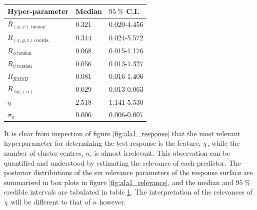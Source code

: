 \begin{table}
    \centering
    \begin{tabular}{|l|l|l|}
    \hline
                          Hyper-parameter &    Median & $\SI{95}{\percent}$ C.I. \\
    \hline\hline
     $R_{(\phi, \psi)\ \mathrm{torsion}}$ &  0.321 & 0.020-4.456 \\
        $R_{(x, y, z)\ \mathrm{coords.}}$ &  0.344 & 0.024-5.572 \\
             $R_{\phi\ \mathrm{torsion}}$ &  0.068 & 0.015-1.176 \\
             $R_{\psi\ \mathrm{torsion}}$ &  0.056 & 0.013-1.327 \\
                               $R_{RMSD}$ &  0.081 & 0.016-1.406 \\
                          $R_{\log{(n)}}$ &  0.029 & 0.013-0.063 \\
                                   $\eta$ &  2.518 & 1.141-5.530 \\
                               $\sigma_n$ &  0.006 & 0.006-0.007 \\
    \hline
    \end{tabular}
    \label{tab:ala1_rel_post}
\end{table}

It is clear from inspection of figure \ref{fig:ala1_response} that the most relevant hyperparameter for determining the test response is the feature, $\chi$, while the number of cluster centres,  $n$, is almost irrelevant. This observation can be quantified and understood by estimating the relevance of each predictor. The posterior distributions of the six relevance parameters of the response surface are summarised in box plots in figure \ref{fig:ala1_relevance}, and  the median and $\SI{95}{\percent}$ credible intervals  are tabulated in table \ref{tab:ala1_rel_post}. The interpretation of the relevances of $\chi$ will be different to that of $n$ however. 

